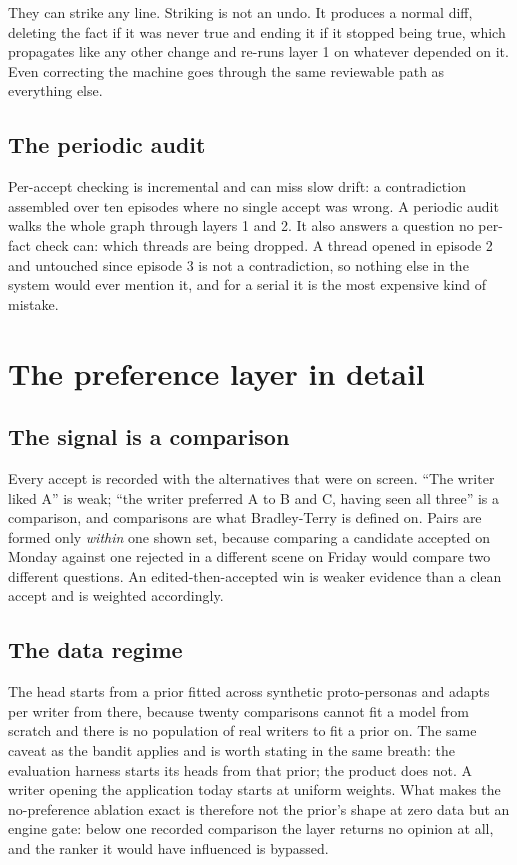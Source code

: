\documentclass{article}
\begin{document}
They can strike any line. Striking is not an undo. It produces a normal diff, deleting the fact if it was never true
and ending it if it stopped being true, which propagates like any other change and re-runs
layer 1 on whatever depended on it. Even correcting the machine
goes through the same reviewable path as everything else.


\subsection{The periodic audit}

Per-accept checking is incremental and can miss slow drift: a contradiction assembled over
ten episodes where no single accept was wrong. A periodic audit walks the whole graph
through layers 1 and 2. It also answers a question no per-fact check can: which threads are
being dropped. A thread opened in episode 2 and untouched since episode 3 is not a
contradiction, so nothing else in the system would ever mention it, and for a serial it is
the most expensive kind of mistake.


\section{The preference layer in detail}
\label{app:preference}

\subsection{The signal is a comparison}

Every accept is recorded with the alternatives that were on screen. ``The writer liked A''
is weak; ``the writer preferred A to B and C, having seen all three'' is a comparison, and
comparisons are what Bradley-Terry is defined on. Pairs are formed only \emph{within} one
shown set, because comparing a candidate accepted on Monday against one rejected in a
different scene on Friday would compare two different questions. An edited-then-accepted win is
weaker evidence than a clean accept and is weighted accordingly.



\subsection{The data regime}

The head starts from a prior fitted across synthetic proto-personas and adapts per writer
from there, because twenty comparisons cannot fit a model from scratch and there is no
population of real writers to fit a prior on. The same caveat as the bandit applies and is
worth stating in the same breath: the evaluation harness starts its heads from that prior;
the product does not. A writer opening the application today starts at uniform weights.
What makes the no-preference ablation exact is therefore not the prior's shape at zero data
but an engine gate: below one recorded comparison the layer returns no opinion at all, and
the ranker it would have influenced is bypassed.
\end{document}
